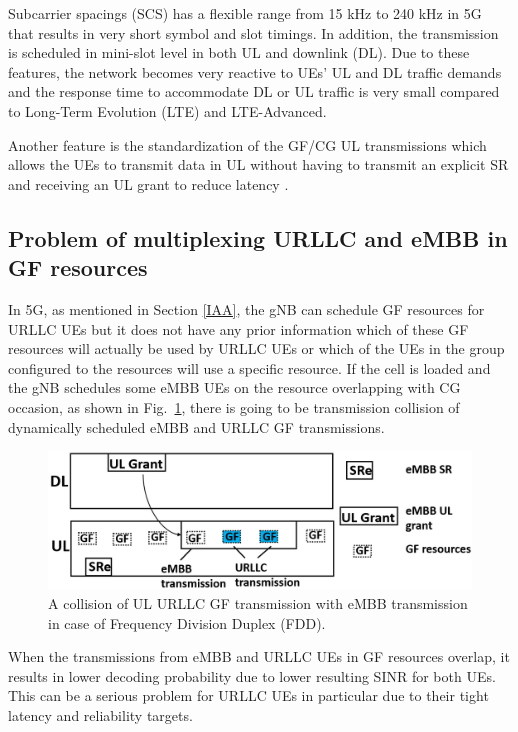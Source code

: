 \documentclass[conference]{IEEEtran}
\begin{document}
Subcarrier spacings (SCS) has a flexible range from 15 kHz to 240 kHz in 5G that results in very short symbol and slot timings\cite{ad2}. In addition, the transmission is scheduled in  mini-slot level in both UL and downlink (DL)\cite{ad3}. Due to these features, the network becomes very reactive to UEs' UL and DL traffic demands and the response time to accommodate DL or UL traffic is very small compared to Long-Term Evolution (LTE) and LTE-Advanced.

Another feature is the standardization of the GF/CG UL transmissions which allows the UEs to transmit data in UL without having to transmit an explicit SR and receiving an UL grant to reduce latency \cite{ad4}.

\subsection{Problem of multiplexing URLLC and eMBB in GF resources}\label{IBB}
In 5G, as mentioned in Section \ref{IAA}, the gNB can schedule GF resources for URLLC UEs but it does not have any prior information which of these GF resources will actually be used by URLLC UEs or which of the UEs in the group configured to the resources will use a specific resource. If the cell is loaded and the gNB schedules some eMBB UEs on the resource overlapping with CG occasion, as shown in Fig.~\ref{fig1}, there is going to be transmission collision of dynamically scheduled eMBB and URLLC GF transmissions. 

\begin{figure}[htbp]
\centerline{\includegraphics[scale=0.25]{fig1.PNG}}
\caption{A collision of UL URLLC GF transmission with eMBB transmission in case of Frequency Division Duplex (FDD).}
\label{fig1}
\vspace{-3mm}
\end{figure}

When the transmissions from eMBB and URLLC UEs in GF resources overlap, it results in lower decoding probability due to lower resulting SINR for both UEs. This can be a serious problem for URLLC UEs in particular due to their tight latency and reliability targets.
\end{document}
